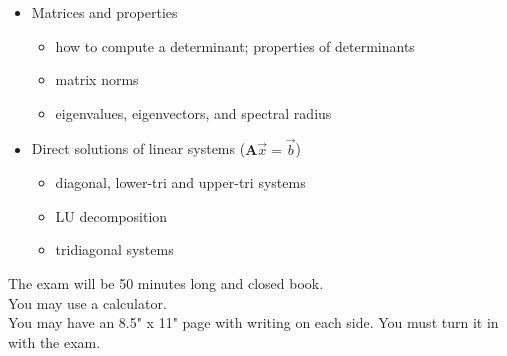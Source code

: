 \documentclass[12pt]{article}
\newcommand{\ve}[1]{\ensuremath{\mathbf{#1}}}
\begin{document}
\begin{itemize}
\item Matrices and properties
  \begin{itemize}
  \item how to compute a determinant; properties of determinants
  \item matrix norms
  \item eigenvalues, eigenvectors, and spectral radius
  \end{itemize}

\item Direct solutions of linear systems ($\ve{A}\vec{x} = \vec{b}$)
  \begin{itemize}
  \item diagonal, lower-tri and upper-tri systems
  \item LU decomposition
  \item tridiagonal systems
  \end{itemize}
\end{itemize}

The exam will be 50 minutes long and closed book. \\
You may use a calculator.\\
You may have an 8.5" x 11" page with writing on each side. You must turn it in with the exam.
\end{document}
